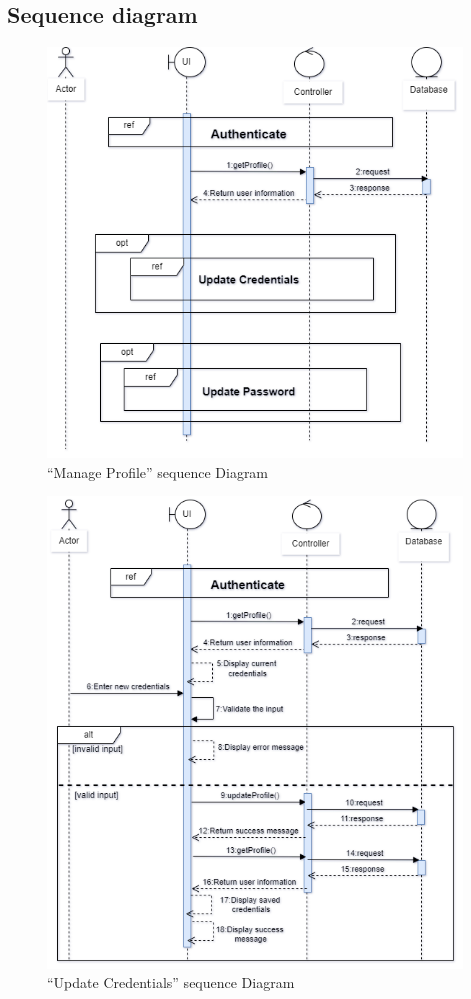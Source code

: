 \subsection{Sequence diagram}
\begin{figure}[H]
\includegraphics[width=0.98\textwidth]{images/chap2/manageProfile_c.png}
    \caption{“Manage Profile” sequence Diagram}
    \label{fig:enter-label}    
\end{figure}
\begin{figure}[H]
\includegraphics[width=0.98\textwidth]{images/chap2/updateCred.png}
    \caption{“Update Credentials” sequence Diagram}
    \label{fig:enter-label}    
\end{figure}
